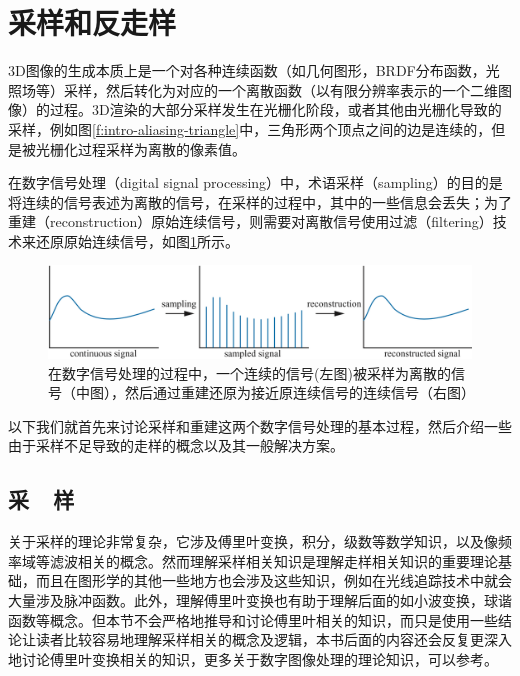 	



\section{采样和反走样}\label{sec:intro-sampling}
3D图像的生成本质上是一个对各种连续函数（如几何图形，BRDF分布函数，光照场等）采样，然后转化为对应的一个离散函数（以有限分辨率表示的一个二维图像）的过程。3D渲染的大部分采样发生在光栅化阶段，或者其他由光栅化导致的采样，例如图\ref{f:intro-aliasing-triangle}中，三角形两个顶点之间的边是连续的，但是被光栅化过程采样为离散的像素值。

在数字信号处理（digital signal processing）中，术语采样（sampling）的目的是将连续的信号表述为离散的信号，在采样的过程中，其中的一些信息会丢失；为了重建（reconstruction）原始连续信号，则需要对离散信号使用过滤（filtering）技术来还原原始连续信号，如图\ref{f:intro-signal-processing}所示。

\begin{figure}
\begin{fullwidth}
	\includegraphics[width=1.\thewidth]{figures/intro/signal-processing}
	\caption{在数字信号处理的过程中，一个连续的信号(左图)被采样为离散的信号（中图），然后通过重建还原为接近原连续信号的连续信号（右图）}
\label{f:intro-signal-processing}
\end{fullwidth}
\end{figure}

以下我们就首先来讨论采样和重建这两个数字信号处理的基本过程，然后介绍一些由于采样不足导致的走样的概念以及其一般解决方案。




\subsection{采~~样}\label{sec:intro-sampling}
关于采样的理论非常复杂，它涉及傅里叶变换，积分，级数等数学知识，以及像频率域等滤波相关的概念。然而理解采样相关知识是理解走样相关知识的重要理论基础，而且在图形学的其他一些地方也会涉及这些知识，例如在光线追踪技术中就会大量涉及脉冲函数。此外，理解傅里叶变换也有助于理解后面的如小波变换，球谐函数等概念。但本节不会严格地推导和讨论傅里叶相关的知识，而只是使用一些结论让读者比较容易地理解采样相关的概念及逻辑，本书后面的内容还会反复更深入地讨论傅里叶变换相关的知识，更多关于数字图像处理的理论知识，可以参考\cite{b:DigitalImageProcessing}。

